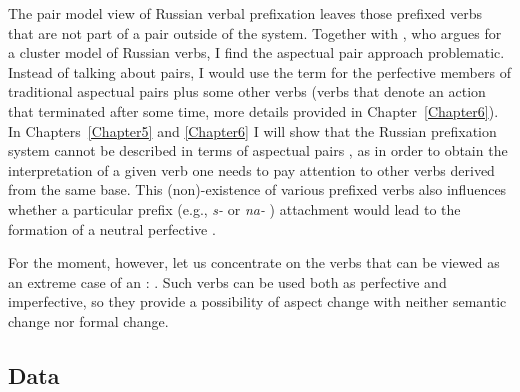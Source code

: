 The pair model view of Russian verbal prefixation  leaves those prefixed verbs that are not part of a pair outside of the system. Together with \citet{Janda:07a}, who argues for a cluster model   of Russian verbs, I find the aspectual pair  approach problematic. Instead of talking about pairs, I would use the term \textit{} for the perfective members of traditional aspectual pairs  plus some other verbs (verbs that denote an action that terminated after some time, more details provided in Chapter~\ref{Chapter6}). In Chapters~\ref{Chapter5} and \ref{Chapter6} I will show that the Russian prefixation  system cannot be described in terms of aspectual pairs , as in order to obtain the interpretation of a given verb one needs to pay attention to other verbs derived from the same base. This (non)-existence of various prefixed verbs also influences whether a particular prefix (e.g., \textit{s-}   or \textit{na-}  ) attachment would lead to the formation of a neutral perfective  .

For the moment, however, let us concentrate on the verbs that can be viewed as an extreme case of an : . Such verbs can be used both as perfective and imperfective, so they provide a possibility of aspect change  with neither semantic change nor formal change.

\subsection{Data}\label{subsection:bi:data}


